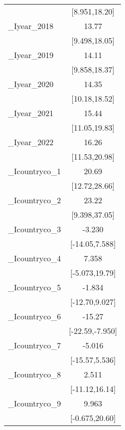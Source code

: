 {\begin{tabular}{l*{1}{c}}
            &         [8.951,18.20]         \\
[1em]
\_Iyear\_2018 &                 13.77\sym{***}\\
            &         [9.498,18.05]         \\
[1em]
\_Iyear\_2019 &                 14.11\sym{***}\\
            &         [9.858,18.37]         \\
[1em]
\_Iyear\_2020 &                 14.35\sym{***}\\
            &         [10.18,18.52]         \\
[1em]
\_Iyear\_2021 &                 15.44\sym{***}\\
            &         [11.05,19.83]         \\
[1em]
\_Iyear\_2022 &                 16.26\sym{***}\\
            &         [11.53,20.98]         \\
[1em]
\_Icountryco\_1&                 20.69\sym{***}\\
            &         [12.72,28.66]         \\
[1em]
\_Icountryco\_2&                 23.22\sym{***}\\
            &         [9.398,37.05]         \\
[1em]
\_Icountryco\_3&                -3.230         \\
            &        [-14.05,7.588]         \\
[1em]
\_Icountryco\_4&                 7.358         \\
            &        [-5.073,19.79]         \\
[1em]
\_Icountryco\_5&                -1.834         \\
            &        [-12.70,9.027]         \\
[1em]
\_Icountryco\_6&                -15.27\sym{***}\\
            &       [-22.59,-7.950]         \\
[1em]
\_Icountryco\_7&                -5.016         \\
            &        [-15.57,5.536]         \\
[1em]
\_Icountryco\_8&                 2.511         \\
            &        [-11.12,16.14]         \\
[1em]
\_Icountryco\_9&                 9.963         \\
            &        [-0.675,20.60]         \\

\end{tabular}}
